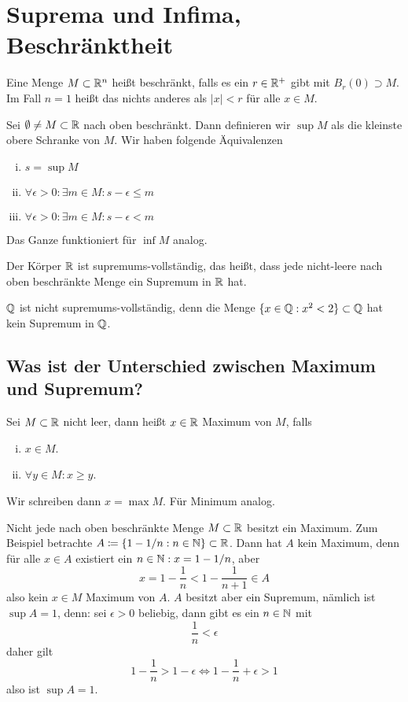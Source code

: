 \section*{Suprema und Infima, Beschränktheit}
\begin{defn}
    Eine Menge $M\subset \mathbb{R}^n$ heißt beschränkt, falls es ein $r\in \mathbb{R}^+$ gibt mit $B_r(0)\supset M$. Im Fall $n=1$ heißt das nichts anderes als $\vert x\vert < r$ für alle $x\in M$.
\end{defn}
\begin{defn}
    Sei $\emptyset\neq M\subset \mathbb{R}$ nach oben beschränkt. Dann definieren wir $\sup M$ als die kleinste obere Schranke von $M$. Wir haben
    folgende Äquivalenzen
    \begin{enumerate}[(i)]
        \item $s = \sup M$
        \item $\forall \epsilon > 0: \exists m\in M: s-\epsilon \le m$
        \item $\forall \epsilon > 0: \exists m\in M: s-\epsilon < m$
    \end{enumerate}
\end{defn}
Das Ganze funktioniert für $\inf M$ analog. 
\begin{satz} Der Körper $\mathbb{R}$ ist supremums-vollständig, das heißt, dass jede nicht-leere nach oben beschränkte Menge ein Supremum
    in $\mathbb{R}$ hat.
\end{satz}
\begin{bem}
    $\mathbb{Q}$ ist nicht supremums-vollständig, denn die Menge $\{x\in \mathbb{Q}:x^2<2\}\subset \mathbb{Q}$ hat kein Supremum in $\mathbb{Q}$. 
\end{bem}
\subsection*{Was ist der Unterschied zwischen Maximum und Supremum?}
\begin{defn}[Maximum]
    Sei $M\subset \mathbb{R}$ nicht leer, dann heißt $x\in \mathbb{R}$ Maximum von $M$, falls 
    \begin{enumerate}[(i)]
        \item $x\in M$.
        \item $\forall y\in M: x\ge y$. 
    \end{enumerate}
    Wir schreiben dann $x = \max M$. Für Minimum analog. 
\end{defn}
Nicht jede nach oben beschränkte Menge $M\subset \mathbb{R}$ besitzt ein Maximum. Zum Beispiel betrachte $A\coloneqq \{ 1- 1/n : n\in \mathbb{N}\}\subset \mathbb{R}$. Dann hat $A$ kein Maximum, denn für alle $x\in A$ existiert ein $n\in \mathbb{N}:x=1-1/n$, aber 
\[
x= 1-\frac{1}{n} < 1-\frac{1}{n+1} \in A    
\]
also kein $x\in M$ Maximum von $A$. $A$ besitzt aber ein Supremum, nämlich ist $\sup A =1$, denn: sei $\epsilon > 0$ beliebig, dann gibt es ein $n\in \mathbb{N}$ mit 
\[
\frac{1}{n} < \epsilon    
\]
daher gilt 
\[
1-\frac{1}{n} > 1-\epsilon \iff 1-\frac{1}{n} + \epsilon > 1    
\]
also ist $\sup A=1$. 
